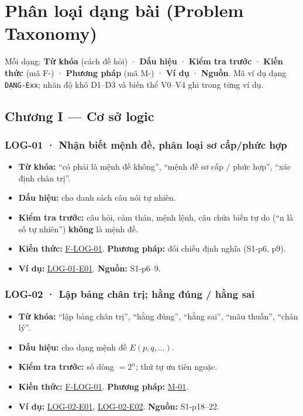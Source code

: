\documentclass[
  10pt,
  twoside,openany]{book}
\providecommand{\tightlist}{%
  \setlength{\itemsep}{0pt}\setlength{\parskip}{0pt}}
\begin{document}
\hypertarget{taxonomy}{%
\chapter{Phân loại dạng bài (Problem Taxonomy)}\label{taxonomy}}

Mỗi dạng: \textbf{Từ khóa} (cách đề hỏi) · \textbf{Dấu hiệu} ·
\textbf{Kiểm tra trước} · \textbf{Kiến thức} (mã F-) · \textbf{Phương
pháp} (mã M-) · \textbf{Ví dụ} · \textbf{Nguồn}. Mã ví dụ dạng
\texttt{DẠNG-Exx}; nhãn độ khó D1--D3 và biến thể V0--V4 ghi trong từng
ví dụ.

\hypertarget{chux1b0ux1a1ng-i-cux1a1-sux1edf-logic}{%
\section{Chương I --- Cơ sở
logic}\label{chux1b0ux1a1ng-i-cux1a1-sux1edf-logic}}

\hypertarget{LOG-01}{%
\subsection{LOG-01 · Nhận biết mệnh đề, phân loại sơ cấp/phức
hợp}\label{LOG-01}}

\begin{itemize}
\tightlist
\item
  \textbf{Từ khóa:} ``có phải là mệnh đề không'', ``mệnh đề sơ cấp /
  phức hợp'', ``xác định chân trị''.
\item
  \textbf{Dấu hiệu:} cho danh sách câu nói tự nhiên.
\item
  \textbf{Kiểm tra trước:} câu hỏi, cảm thán, mệnh lệnh, câu chứa biến
  tự do (``n là số tự nhiên'') \textbf{không} là mệnh đề.
\item
  \textbf{Kiến thức:} \protect\hyperlink{F-LOG-01}{F-LOG-01}.
  \textbf{Phương pháp:} đối chiếu định nghĩa (S1-p6, p9).
\item
  \textbf{Ví dụ:} \protect\hyperlink{LOG-01-E01}{LOG-01-E01}.
  \textbf{Nguồn:} S1-p6--9.
\end{itemize}

\hypertarget{LOG-02}{%
\subsection{LOG-02 · Lập bảng chân trị; hằng đúng / hằng
sai}\label{LOG-02}}

\begin{itemize}
\tightlist
\item
  \textbf{Từ khóa:} ``lập bảng chân trị'', ``hằng đúng'', ``hằng sai'',
  ``mâu thuẫn'', ``chân lý''.
\item
  \textbf{Dấu hiệu:} cho dạng mệnh đề \(E(p,q,\dots)\).
\item
  \textbf{Kiểm tra trước:} số dòng \(=2^n\); thứ tự ưu tiên ngoặc.
\item
  \textbf{Kiến thức:} \protect\hyperlink{F-LOG-01}{F-LOG-01}.
  \textbf{Phương pháp:} \protect\hyperlink{M-01}{M-01}.
\item
  \textbf{Ví dụ:} \protect\hyperlink{LOG-02-E01}{LOG-02-E01},
  \protect\hyperlink{LOG-02-E02}{LOG-02-E02}. \textbf{Nguồn:}
  S1-p18--22.
\end{itemize}
\end{document}
